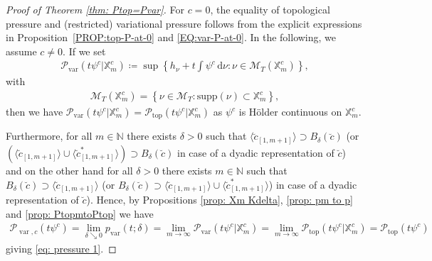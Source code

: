 \documentclass[11pt,reqno]{amsart}
\theoremstyle{plain}
\theoremstyle{definition}
\newcommand{\X}{{\mathbb X}}
\newcommand{\supp}{\mathrm{supp}}
\begin{document}
\begin{proof}[Proof of Theorem \ref{thm: Ptop=Pvar}] 
For $c=0$, the equality of topological pressure and (restricted) variational pressure follows from the explicit expressions in Proposition~\ref{PROP:top-P-at-0} and \eqref{EQ:var-P-at-0}. In the following, we assume $c \neq 0$. If we set  
 \begin{align*}
 \mathcal{P}_{\operatorname{var}}\left(t\psi^{c}\lvert \X_m^{c}\right) \coloneqq \sup \left\{h_{\nu} + t\int \psi^c\,\mathrm{d}\nu\colon \nu\in \mathcal{M}_{T}\left(\X_m^{c}\right)\right\},
\end{align*}
with
\begin{align*}
 \mathcal{M}_T\left(\X_m^{c}\right) = \left\{\nu \in \mathcal{M}_T\colon \supp(\nu) \subset \X_m^c\right\},
\end{align*}
then we have 
$\mathcal{P}_{\operatorname{var}}\left(t\psi^{c}\lvert \X_m^{c}\right)=\mathcal{P}_{\operatorname{top}}\left(t\psi^{c}\lvert \X_m^{c}\right)$ as $\psi^c$ is H\"older continuous on $\X_m^{c}$. 

Furthermore, for all $m\in\mathbb{N}$ there exists $\delta>0$ such that $\langle\breve{c}_{[1,m+1]}\rangle\supset B_{\delta}( \breve{c})$ 
(or $(\langle\breve{c}_{[1,m+1]}\rangle\cup \langle\breve{c}^{\ast}_{[1,m+1]}\rangle) \supset B_{\delta}(\breve{c})$ in case of a dyadic representation of $\breve{c}$) and on the other hand for all $\delta>0$ there exists $m\in\mathbb{N}$ such that $B_{\delta}(\breve{c})\supset \langle\breve{c}_{[1,m+1]}\rangle$ (or $B_{\delta} (\breve{c})\supset \langle\breve{c}_{[1,m+1]}\rangle\cup \langle\breve{c}^{\ast}_{[1,m+1]}\rangle$) in case of a dyadic representation of $\breve{c}$).
Hence, by Propositions \ref{prop: Xm Kdelta}, \ref{prop: pm to p} and \ref{prop: PtopmtoPtop} we have
\begin{align*}
 \mathcal{P}_{\operatorname{var},c}(t\psi^c)
 =\lim_{\delta\searrow 0}p_{\operatorname{var}}(t;\delta)
 =\lim_{m\to\infty}\mathcal{P}_{\operatorname{var}}\left(t\psi^c\lvert \X_m^c\right)
 =\lim_{m\to\infty}\mathcal{P}_{\operatorname{top}}\left(t\psi^c\lvert \X_m^c\right)
 =\mathcal{P}_{\operatorname{top}}\left(t\psi^c\right)
\end{align*}
giving \eqref{eq: pressure 1}. 


\end{proof}
\end{document}
